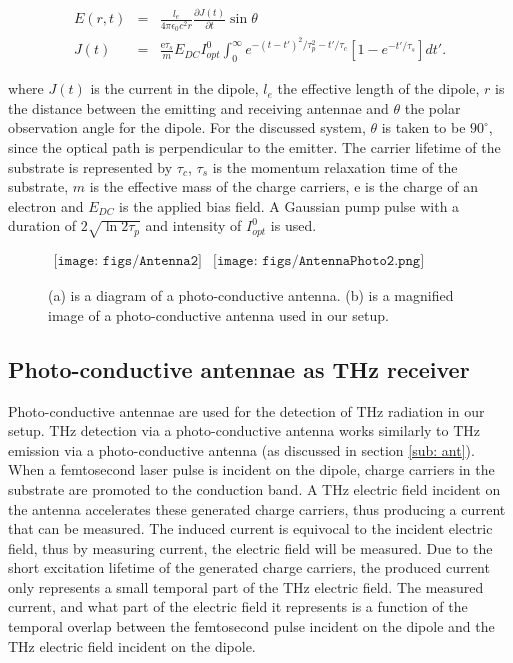 \begin{eqnarray}
E(r,t) &=& \frac{l_{e}}{4\pi\epsilon_{0} c^{2} r}\frac{\partial J(t)}{\partial t}\sin{\theta}\label{eq:E0sim}\\
J(t) &=& \frac{\text{e}\tau_{s}}{m}E_{DC}I_{opt}^{0}\int_{0}^{\infty}e^{-(t-t')^{2}/\tau_{p}^{2}-t'/\tau_{c}}[1-e^{-t'/\tau_{s}}]dt'.
\label{eq:J0sim}
\end{eqnarray}

where $J(t)$ is the current in the dipole, $l_{e}$ the effective length of the dipole, $r$ is the distance between the emitting and receiving antennae and $\theta$ the polar observation angle for the dipole. For the discussed system, $\theta$ is taken to be $90^{\circ}$, since the optical path is perpendicular to the emitter. The carrier lifetime of the substrate is represented by $\tau_{c}$, $\tau_{s}$ is the momentum relaxation time of the substrate, $m$ is the effective mass of the charge carriers, e is the charge of an electron and $E_{DC}$ is the applied bias field. A Gaussian pump pulse with a duration of $2\sqrt{\ln{2}\tau_{p}}$ and intensity of $I_{opt}^{0}$ is used. \cite{Sakai-2005}

\begin{figure}[H]
                \begin{center}$
								\begin{array}{cc}
                \texttt{[image: figs/Antenna2]}&
                \texttt{[image: figs/AntennaPhoto2.png]}
								\end{array}$
								\end{center}
	\caption{(a) is a diagram of a photo-conductive antenna. (b) is a magnified image of a photo-conductive antenna used in our setup.}
	\label{fig:PhoAnt}
\end{figure}

\subsection{Photo-conductive antennae as THz receiver}
\label{sub: antr}
Photo-conductive antennae are used for the detection of THz radiation in our setup. THz detection via a photo-conductive antenna works similarly to THz emission via a photo-conductive antenna (as discussed in section \ref{sub: ant}). When a femtosecond laser pulse is incident on the dipole, charge carriers in the substrate are promoted to the conduction band. A THz electric field incident on the antenna accelerates these generated charge carriers, thus producing a current that can be measured. The induced current is equivocal to the incident electric field, thus by measuring current, the electric field will be measured. Due to the short excitation lifetime of the generated charge carriers, the produced current only represents a small temporal part of the THz electric field. The measured current, and what part of the electric field it represents is a function of the temporal overlap between the femtosecond pulse incident on the dipole and the THz electric field incident on the dipole.
